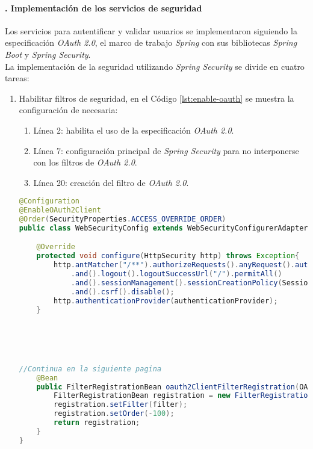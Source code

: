\paragraph{. Implementación de los servicios de seguridad\\}
Los servicios para autentificar y validar usuarios se implementaron siguiendo la especificación \textit{OAuth 2.0}, el marco de trabajo \textit{Spring} con sus bibliotecas \textit{Spring Boot} y \textit{Spring Security}.\\
La implementación de la seguridad utilizando \textit{Spring Security} se divide en cuatro tareas:
\begin{enumerate}
	\item Habilitar filtros de seguridad, en el Código \ref{lst:enable-oauth} se muestra la configuración de necesaria:
	\begin{enumerate}
		\item Línea 2: habilita el uso de la especificación \textit{OAuth 2.0}.
		\item Línea 7: configuración principal de \textit{Spring Security} para no interponerse con los filtros de \textit{OAuth 2.0}.
		\item Línea 20: creación del filtro de \textit{OAuth 2.0}.
	\end{enumerate}
\begin{lstlisting}[language=Java, caption={Clase para habilitar los filtros de seguridad.}, captionpos=b, label={lst:enable-oauth}]
@Configuration
@EnableOAuth2Client
@Order(SecurityProperties.ACCESS_OVERRIDE_ORDER)
public class WebSecurityConfig extends WebSecurityConfigurerAdapter{

	@Override
	protected void configure(HttpSecurity http) throws Exception{
		http.antMatcher("/**").authorizeRequests().anyRequest().authenticated()
			.and().logout().logoutSuccessUrl("/").permitAll()
			.and().sessionManagement().sessionCreationPolicy(SessionCreationPolicy.STATELESS)
			.and().csrf().disable();
		http.authenticationProvider(authenticationProvider);
	}





//Continua en la siguiente pagina
	@Bean
	public FilterRegistrationBean oauth2ClientFilterRegistration(OAuth2ClientContextFilter filter){
		FilterRegistrationBean registration = new FilterRegistrationBean();
		registration.setFilter(filter);
		registration.setOrder(-100);
		return registration;
	}
}	
\end{lstlisting}


\end{enumerate}
